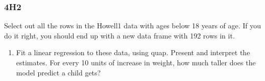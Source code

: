 \documentclass[
]{book}
\newenvironment{Shaded}{\begin{snugshade}}{\end{snugshade}}
\newcommand{\AttributeTok}[1]{\textcolor[rgb]{0.77,0.63,0.00}{#1}}
\newcommand{\CommentTok}[1]{\textcolor[rgb]{0.56,0.35,0.01}{\textit{#1}}}
\newcommand{\DecValTok}[1]{\textcolor[rgb]{0.00,0.00,0.81}{#1}}
\newcommand{\FunctionTok}[1]{\textcolor[rgb]{0.00,0.00,0.00}{#1}}
\newcommand{\NormalTok}[1]{#1}
\newcommand{\OtherTok}[1]{\textcolor[rgb]{0.56,0.35,0.01}{#1}}
\newcommand{\SpecialCharTok}[1]{\textcolor[rgb]{0.00,0.00,0.00}{#1}}
\providecommand{\tightlist}{%
  \setlength{\itemsep}{0pt}\setlength{\parskip}{0pt}}
\begin{document}
\hypertarget{h2-2}{%
\subsubsection*{4H2}\label{h2-2}}

Select out all the rows in the Howell1 data with ages below 18 years of age. If you do it right, you should end up with a new data frame with 192 rows in it.

\begin{enumerate}
\def\labelenumi{\alph{enumi}.}
\tightlist
\item
  Fit a linear regression to these data, using quap. Present and interpret the estimates. For
  every 10 units of increase in weight, how much taller does the model predict a child gets?
\end{enumerate}

\begin{Shaded}
\end{Shaded}
\end{document}
